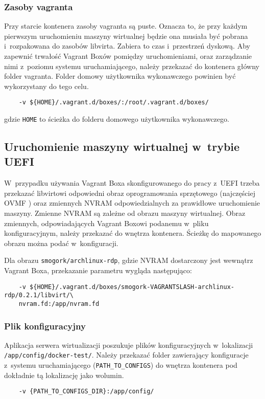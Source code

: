 \documentclass[../opis-rozwiazania.tex]{subfiles}
\begin{document}
\subsubsection{Zasoby vagranta}
Przy starcie kontenera zasoby vagranta są puste.
Oznacza to, że przy każdym pierwszym uruchomieniu maszyny wirtualnej będzie ona musiała być pobrana i~rozpakowana do zasobów libvirta.
Zabiera to czas i~przestrzeń dyskową.
Aby zapewnić trwałość Vagrant Boxów pomiędzy uruchomieniami, oraz zarządzanie nimi z~poziomu systemu uruchamiającego, należy przekazać do kontenera główny folder vagranta.
Folder domowy użytkownika wykonawczego powinien być wykorzystany do tego celu.

\begin{verbatim}
	-v ${HOME}/.vagrant.d/boxes/:/root/.vagrant.d/boxes/
\end{verbatim}
gdzie \texttt{HOME} to ścieżka do folderu domowego użytkownika wykonawczego.

\subsection{Uruchomienie maszyny wirtualnej w~trybie UEFI}

W~przypadku używania Vagrant Boxa skonfigurowanego do pracy z~UEFI trzeba przekazać libvirtowi odpowiedni obraz oprogramowania sprzętowego (najczęściej OVMF \parencite{ovmf}) oraz zmiennych NVRAM odpowiedzialnych za prawidłowe uruchomienie maszyny.
Zmienne NVRAM są zależne od obrazu maszyny wirtualnej.
Obraz zmiennych, odpowiadających Vagrant Boxowi podanemu w~pliku konfiguracyjnym, należy przekazać do wnętrza kontenera.
Ścieżkę do mapowanego obrazu można podać w~konfiguracji.

Dla obrazu \texttt{smogork/archlinux-rdp}, gdzie NVRAM dostarczony jest wewnątrz Vagrant Boxa, przekazanie parametru wygląda następująco:
\begin{verbatim}
	-v ${HOME}/.vagrant.d/boxes/smogork-VAGRANTSLASH-archlinux-rdp/0.2.1/libvirt/\
	nvram.fd:/app/nvram.fd
\end{verbatim}

\subsubsection{Plik konfiguracyjny}
Aplikacja serwera wirtualizacji poszukuje plików konfiguracyjnych w~lokalizacji \texttt{/app/config/docker-test/}.
Należy przekazać folder zawierający konfiguracje z~systemu uruchamiającego (\texttt{PATH\_TO\_CONFIGS}) do wnętrza kontenera pod dokładnie tą lokalizację jako wolumin.
\begin{verbatim}
	-v {PATH_TO_CONFIGS_DIR}:/app/config/
\end{verbatim}
\end{document}
